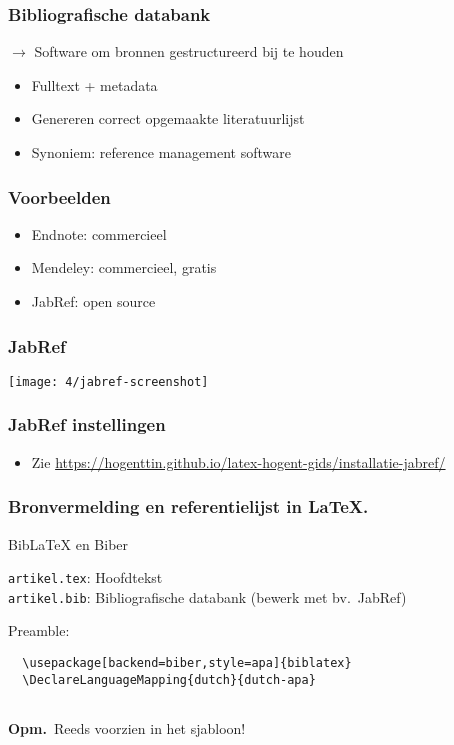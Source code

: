 \documentclass[aspectratio=169]{beamer}
\begin{document}
\begin{frame}
  \frametitle{Bibliografische databank}

	$\rightarrow$ Software om bronnen gestructureerd bij te houden\\

  \begin{itemize}
    \item Fulltext + metadata
    \item Genereren correct opgemaakte literatuurlijst
    \item Synoniem: reference management software
  \end{itemize}

\end{frame}

\begin{frame}
  \frametitle{Voorbeelden}

  \begin{itemize}
    \item Endnote: commercieel
    \item Mendeley: commercieel, gratis
    \item JabRef: open source
  \end{itemize}

\end{frame}

\begin{frame}[plain]
  \frametitle{JabRef}

  \centering
  \texttt{[image: 4/jabref-screenshot]}

\end{frame}

\begin{frame}
  \frametitle{JabRef instellingen}

  \begin{itemize}
    \item Zie \url{https://hogenttin.github.io/latex-hogent-gids/installatie-jabref/}
  \end{itemize}

\end{frame}

\begin{frame}[fragile]
  \frametitle{Bronvermelding en referentielijst in {\LaTeX}.}

  Bib{\LaTeX} en Biber

  \bigskip

  \verb|artikel.tex|: Hoofdtekst\\
  \verb|artikel.bib|: Bibliografische databank (bewerk met bv.~JabRef)

  \bigskip

  Preamble:

  \begin{verbatim}
  \usepackage[backend=biber,style=apa]{biblatex}
  \DeclareLanguageMapping{dutch}{dutch-apa}
  
  \end{verbatim}

  \textbf{Opm.}\ Reeds voorzien in het sjabloon!

\end{frame}
\end{document}

